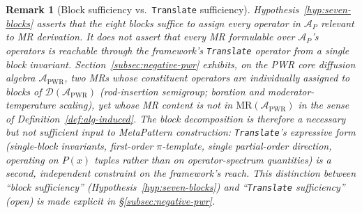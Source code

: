 \documentclass[manuscript]{acmart}
\newtheorem{remark}{Remark}
\begin{document}
\begin{remark}[Block sufficiency vs.\ \texttt{Translate} sufficiency]
\label{rem:block-vs-translate}
Hypothesis~\ref{hyp:seven-blocks} asserts that the eight blocks suffice to \emph{assign} every operator in $\mathcal{A}_P$ relevant to MR derivation. It does not assert that every MR formulable over $\mathcal{A}_P$'s operators is reachable through the framework's \texttt{Translate} operator from a single block invariant. Section~\ref{subsec:negative-pwr} exhibits, on the PWR core diffusion algebra $\mathcal{A}_{\mathrm{PWR}}$, two MRs whose constituent operators are individually assigned to blocks of $\mathcal{D}(\mathcal{A}_{\mathrm{PWR}})$ (rod-insertion semigroup; boration and moderator-temperature scaling), yet whose MR content is not in $\mathrm{MR}(\mathcal{A}_{\mathrm{PWR}})$ in the sense of Definition~\ref{def:alg-induced}. The block decomposition is therefore a necessary but not sufficient input to MetaPattern construction: \texttt{Translate}'s expressive form (single-block invariants, first-order $\pi$-template, single partial-order direction, operating on $P(x)$ tuples rather than on operator-spectrum quantities) is a second, independent constraint on the framework's reach. This distinction between ``block sufficiency'' (Hypothesis~\ref{hyp:seven-blocks}) and ``\texttt{Translate} sufficiency'' (open) is made explicit in \S\ref{subsec:negative-pwr}.
\end{remark}
\end{document}
